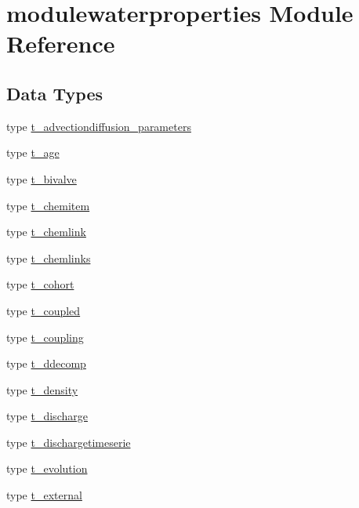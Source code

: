 \hypertarget{namespacemodulewaterproperties}{}\section{modulewaterproperties Module Reference}
\label{namespacemodulewaterproperties}
\subsection*{Data Types}
\begin{DoxyCompactItemize}
\item 
type \mbox{\hyperlink{structmodulewaterproperties_1_1t__advectiondiffusion__parameters}{t\+\_\+advectiondiffusion\+\_\+parameters}}
\item 
type \mbox{\hyperlink{structmodulewaterproperties_1_1t__age}{t\+\_\+age}}
\item 
type \mbox{\hyperlink{structmodulewaterproperties_1_1t__bivalve}{t\+\_\+bivalve}}
\item 
type \mbox{\hyperlink{structmodulewaterproperties_1_1t__chemitem}{t\+\_\+chemitem}}
\item 
type \mbox{\hyperlink{structmodulewaterproperties_1_1t__chemlink}{t\+\_\+chemlink}}
\item 
type \mbox{\hyperlink{structmodulewaterproperties_1_1t__chemlinks}{t\+\_\+chemlinks}}
\item 
type \mbox{\hyperlink{structmodulewaterproperties_1_1t__cohort}{t\+\_\+cohort}}
\item 
type \mbox{\hyperlink{structmodulewaterproperties_1_1t__coupled}{t\+\_\+coupled}}
\item 
type \mbox{\hyperlink{structmodulewaterproperties_1_1t__coupling}{t\+\_\+coupling}}
\item 
type \mbox{\hyperlink{structmodulewaterproperties_1_1t__ddecomp}{t\+\_\+ddecomp}}
\item 
type \mbox{\hyperlink{structmodulewaterproperties_1_1t__density}{t\+\_\+density}}
\item 
type \mbox{\hyperlink{structmodulewaterproperties_1_1t__discharge}{t\+\_\+discharge}}
\item 
type \mbox{\hyperlink{structmodulewaterproperties_1_1t__dischargetimeserie}{t\+\_\+dischargetimeserie}}
\item 
type \mbox{\hyperlink{structmodulewaterproperties_1_1t__evolution}{t\+\_\+evolution}}
\item 
type \mbox{\hyperlink{structmodulewaterproperties_1_1t__external}{t\+\_\+external}}

\end{DoxyCompactItemize}

